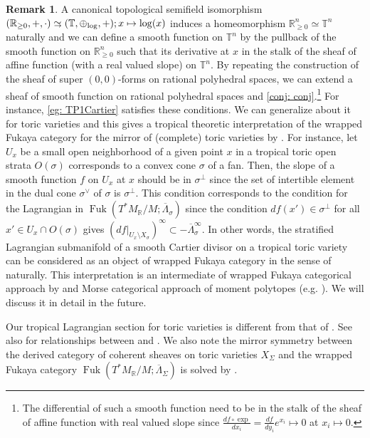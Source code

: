 \documentclass[a4paper,dvipdfmx,reqno,12pt]{amsart}
\theoremstyle{definition}
\newtheorem{Rmk}[Thm]{Remark}
\newcommand{\R}{\mathbb{R}}%
\newcommand{\mb}[1]{\mathbb{#1}}%
\newcommand{\opn}[1]{\operatorname{#1}}
\newcommand{\simto}{ 
\mathrel{\raisebox{0.13em}{${\sim}$}}
\kern -0.75em \mathrel{\raisebox{-0.11em}{${\scriptstyle \to}$}}  
}
\numberwithin{equation}{section}
\begin{document}
\begin{Rmk}
A canonical topological semifield isomorphism 
$(\R_{\geq 0},+,\cdot)\simto 
(\mb{T},\oplus_{\opn{log}},+);x\mapsto \log(x)$
induces a homeomorphism $\R_{\geq 0}^{n}\simeq \mb{T}^{n}$
naturally and we can define a smooth function on 
$\mb{T}^{n}$ by the pullback of the smooth function on 
$\R_{\geq 0}^{n}$ such that its derivative at $x$ in
the stalk of the sheaf of affine function
(with a real valued slope) on $\mb{T}^{n}$.
 By repeating
the construction of the sheaf of super $(0,0)$-forms on 
rational polyhedral spaces, we can extend a sheaf of
smooth function on rational polyhedral spaces and
\cref{conj: conj}.\footnote{
The differential of such a smooth function 
need to be in the stalk of the sheaf of affine function 
with real valued slope since 
$\frac{df\circ \opn{exp}}{dx_i}=
\frac{df}{dy_i}e^{x_i}\mapsto 0$ at 
$x_i\mapsto 0$.}
 For instance, \cref{eg: TP1Cartier} satisfies 
these conditions. We can generalize about it for toric
varieties and this gives a tropical theoretic interpretation 
of the wrapped Fukaya category for the mirror of
(complete) toric varieties by \cite{MR2871160}.
For instance, let $U_{x}$ be a small open neighborhood of 
a given point $x$ in a tropical toric open strata $O(\sigma)$
 corresponds to a convex cone $\sigma$ of a fan.
Then, the slope of a smooth function $f$ on $U_{x}$ at $x$
should be in $\sigma^{\bot}$ since the set of intertible element
in the dual cone $\sigma^{\vee}$ of $\sigma$ is $\sigma^{\bot}$.
This condition corresponds to the condition for the Lagrangian
in $\opn{Fuk}(T^{*}M_{\R}/M;\overline{\Lambda}_{\sigma})$ 
\cite[3.1]{MR2871160} since
the condition $df(x')\in\sigma^{\bot}$ for all 
$x'\in U_x\cap O(\sigma)$ gives 
$(df|_{U_{x}\setminus X_{\sigma}})^{\infty}\subset 
-\overline{\Lambda}_{\sigma}^{\infty}$.
In other words, the stratified Lagrangian submanifold 
of a smooth Cartier divisor on a tropical toric variety
can be considered as 
an object of wrapped Fukaya category in the sense of
\cite{MR2871160} naturally. This interpretation is 
an intermediate of wrapped Fukaya categorical approach by
\cite{MR2871160}
and Morse categorical approach of moment polytopes
(e.g. \cite{MR4234675}).
We will discuss it in detail in the future.

Our tropical Lagrangian section for toric varieties is 
different from that of \cite{MR2240909,MR2529936}.
See also \cite[Appendix C.2.]{MR2871160} for relationships
between \cite{MR2871160} and \cite{MR2240909,MR2529936}.
We also note the mirror symmetry between the derived category of
coherent sheaves on toric varieties $X_{\Sigma}$ and
the wrapped Fukaya category 
$\opn{Fuk}(T^{*}M_{\R}/M;\overline{\Lambda}_{\Sigma})$
is solved by \cite{MR4132582}.
\end{Rmk}
\end{document}
